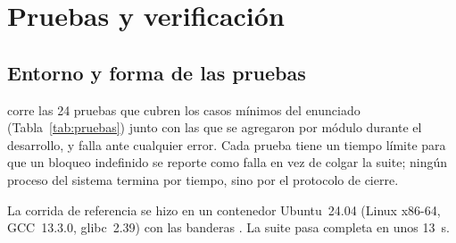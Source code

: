 \section{Pruebas y verificación}
\label{sec:pruebas}

\subsection{Entorno y forma de las pruebas}

 corre las 24 pruebas que cubren los casos mínimos del
enunciado (Tabla~\ref{tab:pruebas}) junto con las que se agregaron por
módulo durante el desarrollo, y falla ante cualquier error. Cada prueba tiene un tiempo límite para que un
bloqueo indefinido se reporte como falla en vez de colgar la suite; ningún
proceso del sistema termina por tiempo, sino por el protocolo de cierre.

La corrida de referencia se hizo en un contenedor Ubuntu~24.04 (Linux
x86-64, GCC~13.3.0, glibc~2.39) con las banderas . La suite pasa completa en unos
13~s.

